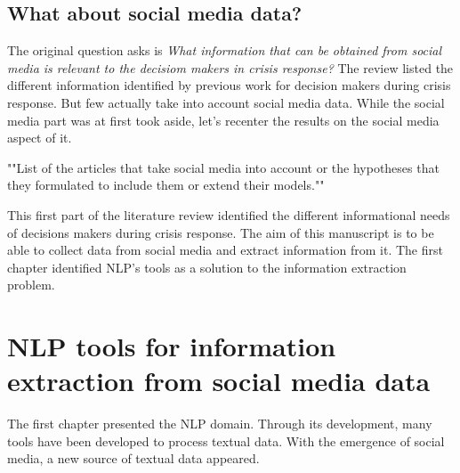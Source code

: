 
\subsection{What about social media data?}
The original question asks is \emph{What information that can be obtained from social media is relevant to the decisiom makers in crisis response?}
The review listed the different information identified by previous work for decision makers during crisis response.
But few actually take into account social media data.
While the social media part was at first took aside, let's recenter the results on the social media aspect of it.

""List of the articles that take social media into account or the hypotheses that they formulated to include them or extend their models.""

This first part of the literature review identified the different informational needs of decisions makers during crisis response.
The aim of this manuscript is to be able to collect data from social media and extract information from it.
The first chapter identified NLP's tools as a solution to the information extraction problem.

\section{NLP tools for information extraction from social media data}
The first chapter presented the NLP domain.
Through its development, many tools have been developed to process textual data.
With the emergence of social media, a new source of textual data appeared.

